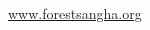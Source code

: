 
\vspace*{-3\onelineskip}

{\centering
\addressesTitleSize

{\soChapter{\MakeUppercase{\branchMonasteries}}}

\href{http://www.forestsangha.org}{\textcolor{darkgold}{www.forestsangha.org}}
\vspace*{\baselineskip}

\hspace*{10mm}
\begin{minipage}{0.8\linewidth}
\begin{multicols}{2}
\setlength{\parindent}{0pt}
\setlength{\parskip}{0.7\baselineskip}
\addressesSize



\end{multicols}
\end{minipage}

}
